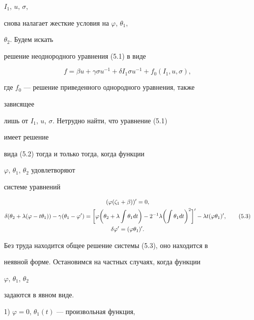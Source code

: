 $I_1$, $u$, $\sigma$,


снова налагает жесткие условия на $\varphi$, $\theta_1$,


$\theta_2$. Будем искать


решение неоднородного уравнения (5.1) в виде


\begin{equation}


f=\beta u+\gamma\sigma u^{-1}+\delta I_1\sigma u^{-1}+


f_0(I_1,u,\sigma),\tag{5.2}


\end{equation}


где $f_0$ --- решение приведенного однородного уравнения, также


зависящее


лишь от $I_1$, $u$, $\sigma$. Нетрудно найти, что уравнение (5.1)


имеет решение


вида (5.2) тогда и только тогда, когда функции


$\varphi$, $\theta_1$, $\theta_2$ удовлетворяют


системе уравнений


\begin{gather}


(\varphi(\zeta_1+\beta))'=0,\notag\\


\delta(\theta_2+\lambda


(\varphi-t\theta_1))-\gamma(\theta_1-\varphi')=


\biggl[\varphi\biggl(\theta_2+\lambda\int \theta_1dt\biggr)


-2^{-1}\lambda\biggl(\int \theta_1dt\biggr)^2\biggr]'-


\lambda t(\varphi\theta_1)',\tag{5.3}\\


\delta\varphi'=(\varphi\theta_1)'.\notag


\end{gather}


Без труда находится общее решение системы (5.3), оно находится в


неявной форме. Остановимся на частных случаях, когда функции


$\varphi$, $\theta_1$, $\theta_2$


задаются в явном виде.





1) $\varphi=0$, $\theta_1(t)$ --- произвольная функция,


